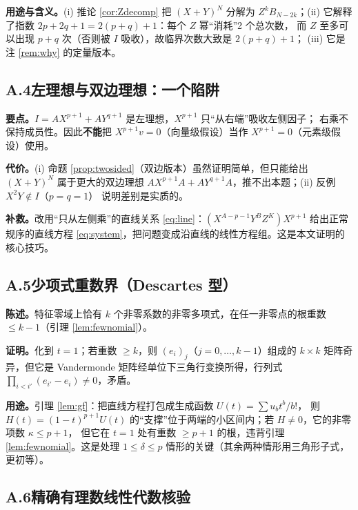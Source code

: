 \documentclass[11pt,UTF8]{ctexart}
\theoremstyle{definition}
\begin{document}
\noindent\textbf{用途与含义。}(i) 推论 \ref{cor:Zdecomp} 把 $(X+Y)^N$ 分解为
$Z^kB_{N-2k}$；(ii) 它解释了指数 $2p+2q+1=2(p+q)+1$：每个 $Z$ 幂“消耗”2 个总次数，
而 $Z$ 至多可以出现 $p+q$ 次（否则被 $I$ 吸收），故临界次数大致是 $2(p+q)+1$；
(iii) 它是注 \ref{rem:why} 的定量版本。

\subsection*{A.4\quad 左理想与双边理想：一个陷阱}

\noindent\textbf{要点。}$I=AX^{p+1}+AY^{q+1}$ 是左理想，$X^{p+1}$ 只“从右端”吸收左侧因子；
右乘不保持成员性。因此\textbf{不能}把 $X^{p+1}v=0$（向量级假设）当作 $X^{p+1}=0$（元素级假设）使用。

\noindent\textbf{代价。}(i) 命题 \ref{prop:twosided}（双边版本）虽然证明简单，但只能给出
$(X+Y)^N$ 属于更大的双边理想 $AX^{p+1}A+AY^{q+1}A$，推不出本题；(ii) 反例 $X^2Y\notin I$（$p=q=1$）
说明差别是实质的。

\noindent\textbf{补救。}改用“只从左侧乘”的直线关系 \eqref{eq:line}：$(X^{A-p-1}Y^BZ^K)X^{p+1}$
给出正常规序的直线方程 \eqref{eq:system}，把问题变成沿直线的线性方程组。这是本文证明的核心技巧。

\subsection*{A.5\quad 少项式重数界（Descartes 型）}

\noindent\textbf{陈述。}特征零域上恰有 $k$ 个非零系数的非零多项式，在任一非零点的根重数 $\le k-1$（引理 \ref{lem:fewnomial}）。

\noindent\textbf{证明。}化到 $t=1$；若重数 $\ge k$，则 $(e_i)_j$（$j=0,\dots,k-1$）组成的
$k\times k$ 矩阵奇异，但它是 Vandermonde 矩阵经单位下三角行变换所得，行列式
$\prod_{i<i'}(e_{i'}-e_i)\ne0$，矛盾。

\noindent\textbf{用途。}引理 \ref{lem:gf}：把直线方程打包成生成函数 $U(t)=\sum u_bt^b/b!$，
则 $H(t)=(1-t)^{p+1}U(t)$ 的“支撑”位于两端的小区间内；若 $H\ne0$，它的非零项数 $\kappa\le p+1$，
但它在 $t=1$ 处有重数 $\ge p+1$ 的根，违背引理 \ref{lem:fewnomial}。这是处理 $1\le\delta\le p$
情形的关键（其余两种情形用三角形子式，更初等）。

\subsection*{A.6\quad 精确有理数线性代数核验}
\end{document}
